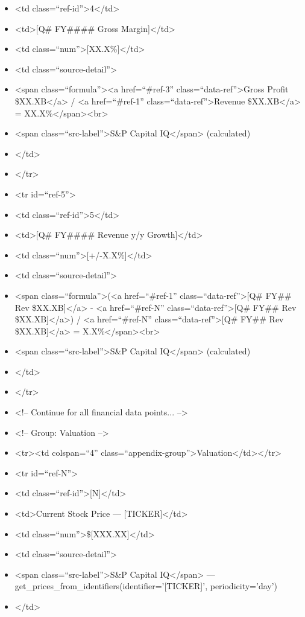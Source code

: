 \documentclass[11pt]{article}
\begin{document}
\begin{itemize}[leftmargin=*,itemsep=2pt,topsep=2pt]
\item {} <td class=``ref-id''>4</td>
\item {} <td>[Q\# FY\#\#\#\# Gross Margin]</td>
\item {} <td class=``num''>[XX.X\%]</td>
\item {} <td class=``source-detail''>
\item {} <span class=``formula''><a href=``\#ref-3'' class=``data-ref''>Gross Profit \$XX.XB</a> / <a href=``\#ref-1'' class=``data-ref''>Revenue \$XX.XB</a> = XX.X\%</span><br>
\item {} <span class=``src-label''>S\&P Capital IQ</span> (calculated)
\item {} </td>
\item {} </tr>
\item {} <tr id=``ref-5''>
\item {} <td class=``ref-id''>5</td>
\item {} <td>[Q\# FY\#\#\#\# Revenue y/y Growth]</td>
\item {} <td class=``num''>[+/-X.X\%]</td>
\item {} <td class=``source-detail''>
\item {} <span class=``formula''>(<a href=``\#ref-1'' class=``data-ref''>[Q\# FY\#\# Rev \$XX.XB]</a> - <a href=``\#ref-N'' class=``data-ref''>[Q\# FY\#\# Rev \$XX.XB]</a>) / <a href=``\#ref-N'' class=``data-ref''>[Q\# FY\#\# Rev \$XX.XB]</a> = X.X\%</span><br>
\item {} <span class=``src-label''>S\&P Capital IQ</span> (calculated)
\item {} </td>
\item {} </tr>
\item {} <!-- Continue for all financial data points... -->
\item {} <!-- Group: Valuation -->
\item {} <tr><td colspan=``4'' class=``appendix-group''>Valuation</td></tr>
\item {} <tr id=``ref-N''>
\item {} <td class=``ref-id''>[N]</td>
\item {} <td>Current Stock Price — [TICKER]</td>
\item {} <td class=``num''>\$[XXX.XX]</td>
\item {} <td class=``source-detail''>
\item {} <span class=``src-label''>S\&P Capital IQ</span> — get\_\allowbreak{}prices\_\allowbreak{}from\_\allowbreak{}identifiers(identifier='[TICKER]', periodicity='day')
\item {} </td>

\end{itemize}
\end{document}
